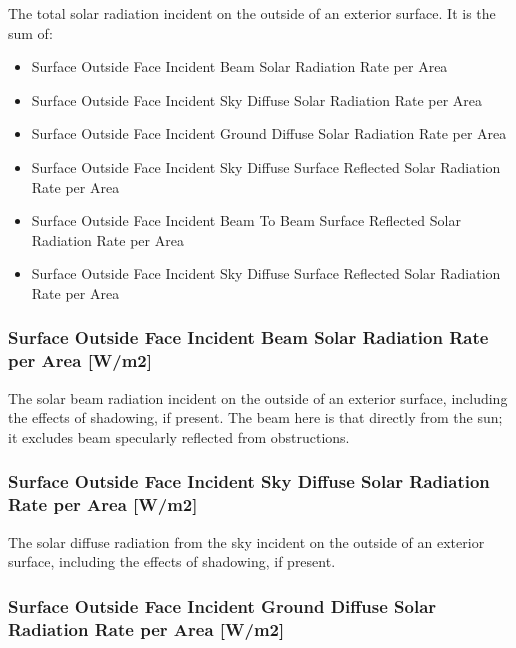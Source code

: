 The total solar radiation incident on the outside of an exterior surface. It is the sum of:

\begin{itemize}
\item
  Surface Outside Face Incident Beam Solar Radiation Rate per Area
\item
  Surface Outside Face Incident Sky Diffuse Solar Radiation Rate per Area
\item
  Surface Outside Face Incident Ground Diffuse Solar Radiation Rate per Area
\item
  Surface Outside Face Incident Sky Diffuse Surface Reflected Solar Radiation Rate per Area
\item
  Surface Outside Face Incident Beam To Beam Surface Reflected Solar Radiation Rate per Area
\item
  Surface Outside Face Incident Sky Diffuse Surface Reflected Solar Radiation Rate per Area
\end{itemize}

\subsubsection{Surface Outside Face Incident Beam Solar Radiation Rate per Area {[}W/m2{]}}\label{surface-outside-face-incident-beam-solar-radiation-rate-per-area-wm2}

The solar beam radiation incident on the outside of an exterior surface, including the effects of shadowing, if present. The beam here is that directly from the sun; it excludes beam specularly reflected from obstructions.

\subsubsection{Surface Outside Face Incident Sky Diffuse Solar Radiation Rate per Area {[}W/m2{]}}\label{surface-outside-face-incident-sky-diffuse-solar-radiation-rate-per-area-wm2}

The solar diffuse radiation from the sky incident on the outside of an exterior surface, including the effects of shadowing, if present.

\subsubsection{Surface Outside Face Incident Ground Diffuse Solar Radiation Rate per Area {[}W/m2{]}}\label{surface-outside-face-incident-ground-diffuse-solar-radiation-rate-per-area-wm2}

